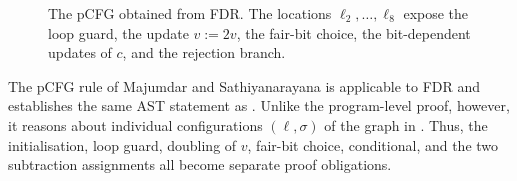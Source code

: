 \begin{figure}[t]

    \vspace{-1mm}
    \caption{The pCFG obtained from FDR. The locations
    $\ell_2,\ldots,\ell_8$ expose the loop guard, the update $v:=2v$, the
    fair-bit choice, the bit-dependent updates of $c$, and the rejection
    branch.}
    \label{fig:fdr-pcfg}
\end{figure}


The pCFG rule of Majumdar and Sathiyanarayana is applicable to FDR and
establishes the same AST statement as .  Unlike the
program-level proof, however, it reasons about individual configurations
$(\ell,\sigma)$ of the graph in .  Thus, the initialisation,
loop guard, doubling of $v$, fair-bit choice, conditional, and the two
subtraction assignments all become separate proof obligations.

